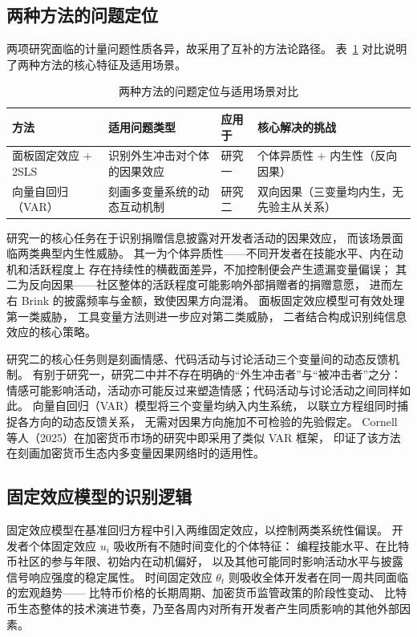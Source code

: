 \subsection{两种方法的问题定位}

两项研究面临的计量问题性质各异，故采用了互补的方法论路径。
表~\ref{tab:method-comparison} 对比说明了两种方法的核心特征及适用场景。

\begin{table}[htbp]
    \centering
    \caption{两种方法的问题定位与适用场景对比}
    \label{tab:method-comparison}
    \begin{tabularx}{\textwidth}{lXXX}
        \toprule
        方法 & 适用问题类型 & 应用于 & 核心解决的挑战 \\
        \midrule
        面板固定效应 + 2SLS
            & 识别外生冲击对个体的因果效应
            & 研究一
            & 个体异质性 + 内生性（反向因果）\\
        向量自回归（VAR）
            & 刻画多变量系统的动态互动机制
            & 研究二
            & 双向因果（三变量均内生，无先验主从关系）\\
        \bottomrule
    \end{tabularx}
\end{table}

研究一的核心任务在于识别捐赠信息披露对开发者活动的因果效应，
而该场景面临两类典型内生性威胁。
其一为个体异质性——不同开发者在技能水平、内在动机和活跃程度上
存在持续性的横截面差异，不加控制便会产生遗漏变量偏误；
其二为反向因果——社区整体的活跃程度可能影响外部捐赠者的捐赠意愿，
进而左右 Brink 的披露频率与金额，致使因果方向混淆。
面板固定效应模型可有效处理第一类威胁，
工具变量方法则进一步应对第二类威胁，
二者结合构成识别纯信息效应的核心策略。

研究二的核心任务则是刻画情感、代码活动与讨论活动三个变量间的动态反馈机制。
有别于研究一，研究二中并不存在明确的“外生冲击者”与“被冲击者”之分：
情感可能影响活动，活动亦可能反过来塑造情感；代码活动与讨论活动之间同样如此。
向量自回归（VAR）模型将三个变量均纳入内生系统，
以联立方程组同时捕捉各方向的动态反馈关系，
无需对因果方向施加不可检验的先验假定\cite{sims1980macroeconomics}。
Cornell 等人（2025）在加密货币市场的研究中即采用了类似 VAR 框架，
印证了该方法在刻画加密货币生态内多变量因果网络时的适用性\cite{cornell2025vector}。

\subsection{固定效应模型的识别逻辑}

固定效应模型在基准回归方程中引入两维固定效应，以控制两类系统性偏误。
开发者个体固定效应 $u_i$ 吸收所有不随时间变化的个体特征：
编程技能水平、在比特币社区的参与年限、初始内在动机偏好，
以及其他可能同时影响活动水平与披露信号响应强度的稳定属性。
时间固定效应 $\theta_t$ 则吸收全体开发者在同一周共同面临的宏观趋势——
比特币价格的长期周期、加密货币监管政策的阶段性变动、
比特币生态整体的技术演进节奏，乃至各周内对所有开发者产生同质影响的其他外部因素。


